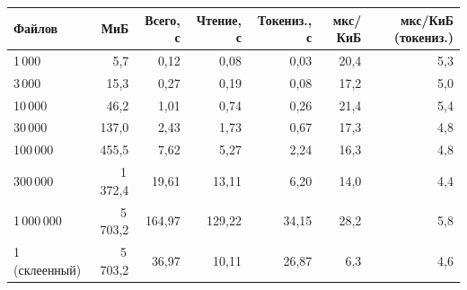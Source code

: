 \begin{tabular}{|l|r|r|r|r|r|r|}
\hline
Файлов & МиБ & Всего, с & Чтение, с & Токениз., с & мкс/КиБ & мкс/КиБ (токениз.) \\
\hline
1\,000 & 5,7 & 0,12 & 0,08 & 0,03 & 20,4 & 5,3 \\
\hline
3\,000 & 15,3 & 0,27 & 0,19 & 0,08 & 17,2 & 5,0 \\
\hline
10\,000 & 46,2 & 1,01 & 0,74 & 0,26 & 21,4 & 5,4 \\
\hline
30\,000 & 137,0 & 2,43 & 1,73 & 0,67 & 17,3 & 4,8 \\
\hline
100\,000 & 455,5 & 7,62 & 5,27 & 2,24 & 16,3 & 4,8 \\
\hline
300\,000 & 1\,372,4 & 19,61 & 13,11 & 6,20 & 14,0 & 4,4 \\
\hline
1\,000\,000 & 5\,703,2 & 164,97 & 129,22 & 34,15 & 28,2 & 5,8 \\
\hline
1 (склеенный) & 5\,703,2 & 36,97 & 10,11 & 26,87 & 6,3 & 4,6 \\
\hline
\end{tabular}
